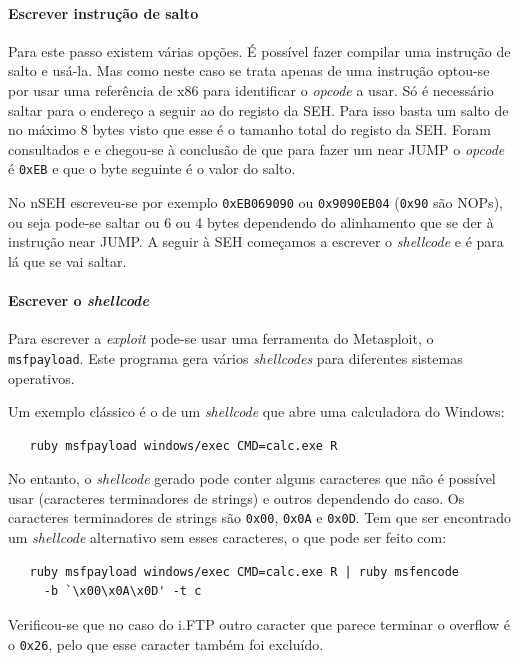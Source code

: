 \documentclass[11pt,a4paper]{article}
\begin{document}
\paragraph*{Escrever instrução de salto} Para este passo existem várias opções. É possível fazer compilar uma instrução de salto e usá-la. Mas como neste caso se trata apenas de uma instrução optou-se por usar uma referência de x86 para identificar o \textit{opcode} a usar. Só é necessário saltar para o endereço a seguir ao do registo da SEH. Para isso basta um salto de no máximo 8 bytes visto que esse é o tamanho total do registo da SEH. Foram consultados \cite{AMD64vol3_2013} e \cite{refx86asm} e chegou-se à conclusão de que para fazer um near JUMP o \textit{opcode} é \texttt{0xEB} e que o byte seguinte é o valor do salto.

No nSEH escreveu-se por exemplo \texttt{0xEB069090} ou \texttt{0x9090EB04} (\texttt{0x90} são NOPs), ou seja pode-se saltar ou 6 ou 4 bytes dependendo do alinhamento que se der à instrução near JUMP. A seguir à SEH começamos a escrever o \textit{shellcode} e é para lá que se vai saltar.

\paragraph*{Escrever o \textit{shellcode}} Para escrever a \textit{exploit} pode-se usar uma ferramenta do Metasploit, o \texttt{msfpayload}. Este programa gera vários \textit{shellcodes} para diferentes sistemas operativos.

Um exemplo clássico é o de um \textit{shellcode} que abre uma calculadora do Windows:

\begin{lstlisting}
   ruby msfpayload windows/exec CMD=calc.exe R
\end{lstlisting}


No entanto, o \textit{shellcode} gerado pode conter alguns caracteres que não é possível usar (caracteres terminadores de strings) e outros dependendo do caso. Os caracteres terminadores de strings são \texttt{0x00}, \texttt{0x0A} e \texttt{0x0D}. Tem que ser encontrado um \textit{shellcode} alternativo sem esses caracteres, o que pode ser feito com:

\begin{lstlisting}
   ruby msfpayload windows/exec CMD=calc.exe R | ruby msfencode
     -b `\x00\x0A\x0D' -t c
\end{lstlisting}


Verificou-se que no caso do i.FTP outro caracter que parece terminar o overflow é o \texttt{0x26}, pelo que esse caracter também foi excluído.
\end{document}
